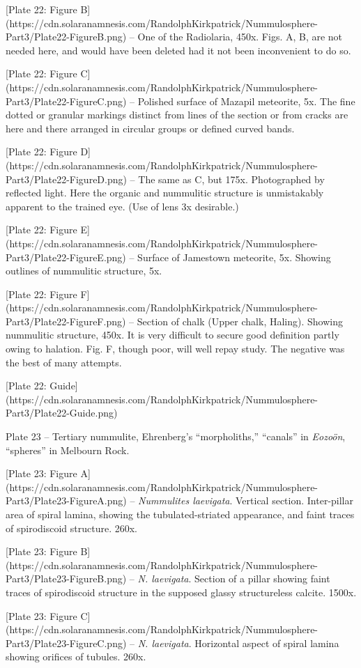 \documentclass[a4paper, 12pt, oneside]{article}
\begin{document}
[Plate 22: Figure B](https://cdn.solaranamnesis.com/RandolphKirkpatrick/Nummulosphere-Part3/Plate22-FigureB.png) -- One of the Radiolaria, 450x. Figs. A, B, are not needed here, and would have been deleted had it not been inconvenient to do so.

[Plate 22: Figure C](https://cdn.solaranamnesis.com/RandolphKirkpatrick/Nummulosphere-Part3/Plate22-FigureC.png) -- Polished surface of Mazapil meteorite, 5x. The fine dotted or granular markings distinct from lines of the section or from cracks are here and there arranged in circular groups or defined curved bands.

[Plate 22: Figure D](https://cdn.solaranamnesis.com/RandolphKirkpatrick/Nummulosphere-Part3/Plate22-FigureD.png) -- The same as C, but 175x. Photographed by reflected light. Here the organic and nummulitic structure is unmistakably apparent to the trained eye. (Use of lens 3x desirable.)

[Plate 22: Figure E](https://cdn.solaranamnesis.com/RandolphKirkpatrick/Nummulosphere-Part3/Plate22-FigureE.png) -- Surface of Jamestown meteorite, 5x. Showing outlines of nummulitic structure, 5x.

[Plate 22: Figure F](https://cdn.solaranamnesis.com/RandolphKirkpatrick/Nummulosphere-Part3/Plate22-FigureF.png) -- Section of chalk (Upper chalk, Haling). Showing nummulitic structure, 450x. It is very difficult to secure good definition partly owing to halation. Fig. F, though poor, will well repay study. The negative was the best of many attempts.

[Plate 22: Guide](https://cdn.solaranamnesis.com/RandolphKirkpatrick/Nummulosphere-Part3/Plate22-Guide.png)

Plate 23 -- Tertiary nummulite, Ehrenberg's ``morpholiths,'' ``canals'' in \emph{Eozoön}, ``spheres'' in Melbourn Rock.

[Plate 23: Figure A](https://cdn.solaranamnesis.com/RandolphKirkpatrick/Nummulosphere-Part3/Plate23-FigureA.png) -- \emph{Nummulites laevigata}. Vertical section. Inter-pillar area of spiral lamina, showing the tubulated-striated appearance, and faint traces of spirodiscoid structure. 260x.

[Plate 23: Figure B](https://cdn.solaranamnesis.com/RandolphKirkpatrick/Nummulosphere-Part3/Plate23-FigureB.png) -- \emph{N. laevigata}. Section of a pillar showing faint traces of spirodiscoid structure in the supposed glassy structureless calcite. 1500x.

[Plate 23: Figure C](https://cdn.solaranamnesis.com/RandolphKirkpatrick/Nummulosphere-Part3/Plate23-FigureC.png) -- \emph{N. laevigata}. Horizontal aspect of spiral lamina showing orifices of tubules. 260x.
\end{document}
